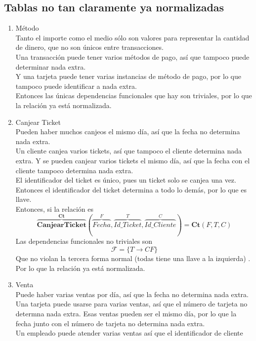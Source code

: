 \documentclass[10pt]{article}
\begin{document}
\subsection{Tablas no tan claramente ya normalizadas}
\begin{enumerate}
	\item Método\\
	Tanto el importe como el medio sólo son valores para representar la cantidad
	de dinero, que no son únicos entre transacciones.\\
	Una transacción puede tener varios métodos de pago, así que tampoco
	puede determinar nada extra.\\
	Y una tarjeta puede tener varias instancias de método de pago, por lo que
	tampoco puede identificar a nada extra. \\
	Entonces las únicas dependencias funcionales que hay son triviales, por lo
	que la relación ya está normalizada.
	\item Canjear Ticket \\
	Pueden haber muchos canjeos el mismo día, así que la fecha no determina nada
	extra. \\ 
	Un cliente canjea varios tickets, así que tampoco el cliente determina
	nada extra. Y se pueden canjear varios tickets el mismo día, así que la 
	fecha con el cliente tampoco determina nada extra.\\
	El identificador del ticket es único, pues un ticket solo se canjea una vez.
	Entonces el identificador del ticket determina a todo lo demás, por lo que
	es llave.\\
	Entonces, si la relación es 
   \[\overbrace{{\textbf{CanjearTicket}}}^{\textbf{Ct}} 
   (
	   \overbrace{Fecha}^{F}, \overbrace{Id\_Ticket}^{T},
	   \overbrace{Id\_Cliente}^{C}
	)
	= 
	\textbf{Ct}(F, T, C)
	\]
	Las dependencias funcionales no triviales son 
	\[\mathcal{F} = \{T \rightarrow CF\}\]
	Que no violan la tercera forma normal (todas tiene una llave a la izquierda)
	.\\
	Por lo que la relación ya está normalizada.
	\item Venta \\
	Puede haber varias ventas por día, así que la fecha no determina nada extra.\\
	Una tarjeta puede usarse para varias ventas, así que el número de tarjeta no
	determna nada extra. Esas ventas pueden ser el mismo día, por lo que la fecha
	junto con el número de tarjeta no determina nada extra.\\
	Un empleado puede atender varias ventas así que el identificador de cliente

\end{enumerate}
\end{document}
